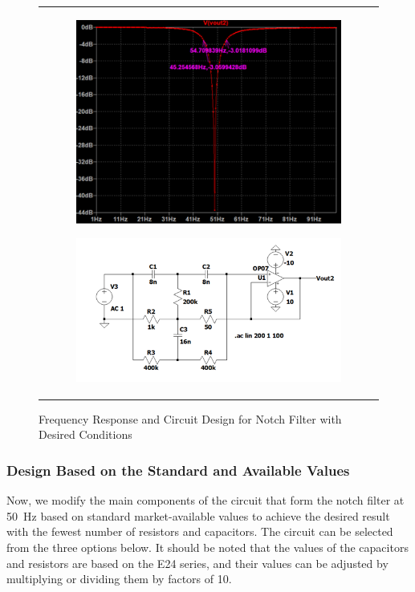 \documentclass[hidelinks,12pt]{article}
\begin{document}
	\begin{figure}[!h]
		\centering
			\begin{tabular}{c}
				\begin{subfigure}[t]{0.45\textwidth}
					\centering
					\includegraphics[width=\textwidth]{figures/Notch Filter Design/freq_response_desired}
				\end{subfigure}
				\hfill
				\begin{subfigure}[t]{0.5\textwidth}
					\centering
					\includegraphics[width=\textwidth]{figures/Notch Filter Design/desired_circuit}
				\end{subfigure}
			\end{tabular}
		\caption{Frequency Response and Circuit Design for Notch Filter with Desired Conditions}
	\end{figure}

	\subsubsection{Design Based on the Standard and Available Values}
	Now, we modify the main components of the circuit that form the notch filter at 50~Hz based on standard market-available values to achieve the desired result with the fewest number of resistors and capacitors. The circuit can be selected from the three options below. It should be noted that the values of the capacitors and resistors are based on the E24 series, and their values can be adjusted by multiplying or dividing them by factors of 10.
\end{document}
